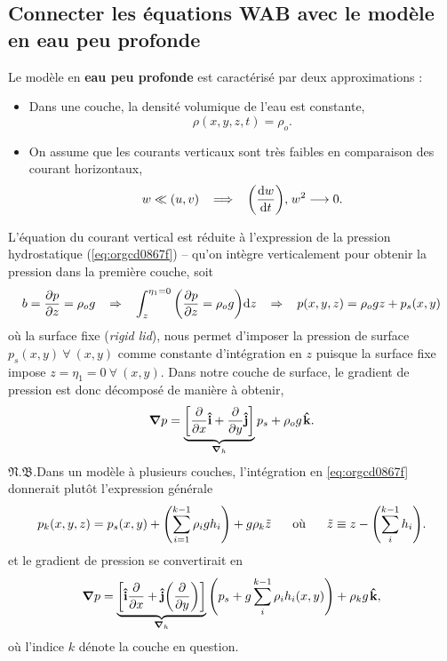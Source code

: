 \documentclass[10pt]{report}
\numberwithin{equation}{section}
\newcommand{\ivf}{\vb{\hat{i}}}
\newcommand{\jvf}{\vb{\hat{j}}}
\newcommand{\kvf}{\vb{\hat{k}}}
\newcommand{\pt}{\hspace{1pt}} %
\newcommand{\nb}{\underline{{\footnotesize\EightStarConvex}\pt $\mathfrak{N.B.}$\vphantom{p}}\hspace{3pt}}
\begin{document}
\subsection{Connecter les équations WAB avec le modèle en eau peu profonde}
\label{sec:org956a437}

Le modèle en \textbf{eau peu profonde} est caractérisé par deux approximations :
\begin{itemize}
\item Dans une couche, la densité volumique de l'eau est constante,
\begin{equation}
   \rho(x,y,z,t) = \rho_o.   
\end{equation}

\item On assume que les courants verticaux sont très faibles en comparaison des courant horizontaux,
\begin{equation}
   w \ll (u,v) \hspace{0.3cm} \Longrightarrow \hspace{0.3cm} \qty(\dv{w}{t}),\pt w^2 \longrightarrow 0.
\end{equation}
\end{itemize}
L'équation du courant vertical est réduite à l'expression de la pression hydrostatique (\ref{eq:orgcd0867f}) -- qu'on intègre verticalement pour obtenir la pression dans la première couche, soit
\begin{equation}
\label{eq:orgcd0867f}
   b = \pdv{p}{z} = \rho_o g \hspace{0.3cm}
   \Rightarrow \hspace{0.3cm} \int_{z}^{\eta_1=0} \qty( \pdv{p}{z} = \rho_o g ) \dd z \hspace{0.3cm}
   \Rightarrow \hspace{0.3cm} p(x,y,z) = \rho_o gz + p_s(x,y)
\end{equation}
où la surface fixe (\emph{rigid lid}), nous permet d'imposer la pression de surface \(p_s(x,y)\ \forall \ (x,y)\) comme constante d'intégration en \(z\) puisque la surface fixe impose \(z=\eta_1=0\ \forall\ (x,y)\).
Dans notre couche de surface, le gradient de pression est donc décomposé de manière à obtenir,
\begin{equation}
   \gradient{p} = \underbrace{\qty[\pdv{}{x}\ivf + \pdv{}{y} \jvf]}_{\gradient_h }p_s + \rho_o g \pt\kvf.
\end{equation}
\nb Dans un modèle à plusieurs couches, l'intégration en \ref{eq:orgcd0867f} donnerait plutôt l'expression générale
\begin{equation}
   p_k(x,y,z) = p_s(x,y) + \qty(\sum_{i=1}^{k-1} \rho_i g h_i) + g\rho_k \tilde{z}
   \hspace{0.6cm} \text{où}\hspace{0.6cm}
   \tilde{z}\equiv z-\qty(\sum_i^{k-1} h_i).
\end{equation}
et le gradient de pression se convertirait en
\begin{equation}
   \gradient{p} = \underbrace{\qty[\ivf\pdv{}{x} + \jvf\qty(\pdv{}{y})]}_{\gradient_h }\qty(p_s + g \sum_i^{k-1} \rho_i h_i(x,y))
   +\rho_k g \pt\kvf,
\end{equation}
où l'indice \(k\) dénote la couche en question.\bigskip
\end{document}
